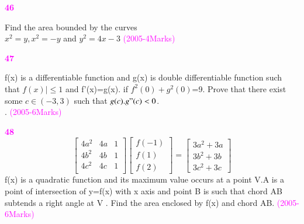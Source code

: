\documentclass[journal,12pt,twocolumn]{IEEEtran}
\theoremstyle{remark}
\begin{document}
																					      \textbf{\textcolor{magenta}{46}}
																					         
																						    Find the area bounded by the curves \\  
																						       $x^2=y,x^2=-y$ and $y^2=4x-3$
																						          \hfill{\textcolor{magenta}{(2005-4Marks)}}
																							     
																							        \textbf{\textcolor{magenta}{47}}
																								   
																								      f(x) is a differentiable function and g(x) is  double differentiable function such that $f(x)|\le1$ and f'(x)=g(x). if $f^2(0)+g^2(0)$=9. Prove that there exist some $c\in(-3,3)$ such that $g(c).g"(c)<0$.\\.
																								         \hfill{\textcolor{magenta}{(2005-6Marks)}}

																									    \textbf{\textcolor{magenta}{48}}
																									       \[
																									          \begin{bmatrix}
																										     4a^2 & 4a & 1\\
																										        4b^2 & 4b & 1\\
																											   4c^2 & 4c & 1\\
																											      \end{bmatrix}
																											         \begin{bmatrix}
																												        f(-1)\\
																													       f(1)\\
																													              f(2)
																														         \end{bmatrix}
																															    =
																															       \begin{bmatrix}
																															          3a^2+3a\\
																																     3b^2+3b\\
																																        3c^2+3c
																																	   \end{bmatrix}
																																	       \]
																																	          f(x) is a quadratic function and its maximum value occurs at a point V.A is a point of intersection of y=f(x) with x axis and point B is such that chord AB subtends a right angle at V . Find the area enclosed by f(x) and chord AB.
																																		    \hfill{\textcolor{magenta}{(2005-6Marks)}}
\end{document}
